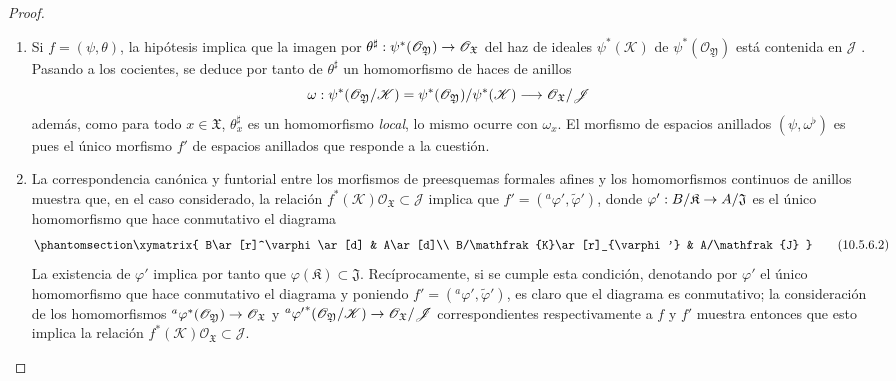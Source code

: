 \documentclass[oneside]{amsart}
\theoremstyle{ega-env-style}
\theoremstyle{ega-thm-env-style}
\theoremstyle{ega-defn-env-style}
\renewcommand{\to}{\mathchoice{\longrightarrow}{\rightarrow}{\rightarrow}{\rightarrow}}
\let\EGAOriginalLabel\label
\renewcommand{\label}[1]{\phantomsection\EGAOriginalLabel{#1}}
\begin{document}
\begin{proof}
\medskip\noindent
\begin{enumerate}
  \item[\rm{(i)}] Si $f=(\psi,\theta)$, la hipótesis implica que la imagen por $\theta^\sharp:\psi^*(\mathscr{O}_{\mathfrak{Y}})\to
    \mathscr{O}_{\mathfrak{X}}$ del haz de ideales $\psi^*(\mathscr{K})$ de $\psi^*(\mathscr{O}_{\mathfrak{Y}})$ está contenida en $\mathscr{J}$ .
    Pasando a los cocientes, se deduce por tanto de $\theta^\sharp$ un homomorfismo de haces de anillos
    \[
      \omega:\psi^*(\mathscr{O}_{\mathfrak{Y}}/\mathscr{K})
      =\psi^*(\mathscr{O}_{\mathfrak{Y}})/\psi^*(\mathscr{K})
      \to\mathscr{O}_{\mathfrak{X}}/\mathscr{J}
    \]
    además, como para todo $x\in\mathfrak{X}$, $\theta_x^\sharp$ es un homomorfismo \emph{local}, lo mismo ocurre con $\omega_x$.
    El morfismo de espacios anillados $(\psi,\omega^\flat)$ es pues  el único morfismo $f'$ de espacios anillados que responde a la cuestión.
  \item[\rm{(ii)}] La correspondencia canónica y funtorial entre los morfismos de preesquemas formales afines y los homomorfismos continuos de anillos  muestra que, en el caso considerado, la relación $f^*(\mathscr{K})\mathscr{O}_{\mathfrak{X}}\subset\mathscr{J}$ implica que $f'=({}^a\varphi',\widetilde{\varphi}')$, donde $\varphi':B/\mathfrak{K}\to A/\mathfrak{J}$ es el único homomorfismo que hace conmutativo el diagrama
    \[
      \label{I.10.5.6.2-fr}
      \xymatrix{
        B\ar[r]^\varphi\ar[d] & A\ar[d]\\
        B/\mathfrak{K}\ar[r]_{\varphi'} & A/\mathfrak{J}
      }
      \tag{10.5.6.2}
    \]
    La existencia de $\varphi'$ implica por tanto que $\varphi(\mathfrak{K})\subset\mathfrak{J}$.
    Recíprocamente, si se cumple esta condición, denotando por $\varphi'$ el único homomorfismo que hace conmutativo el diagrama  y poniendo $f'=({}^a\varphi',\widetilde{\varphi}')$, es claro que el diagrama  es conmutativo; la consideración de los homomorfismos ${}^a\varphi^*(\mathscr{O}_{\mathfrak{Y}})\to
    \mathscr{O}_{\mathfrak{X}}$ y ${}^a{\varphi'}^*(\mathscr{O}_{\mathfrak{Y}}/\mathscr{K})\to
    \mathscr{O}_{\mathfrak{X}}/\mathscr{J}$ correspondientes respectivamente a $f$ y $f'$ muestra entonces que esto implica la relación $f^*(\mathscr{K})\mathscr{O}_{\mathfrak{X}}\subset\mathscr{J}$.
\end{enumerate}
\end{proof}
\end{document}
